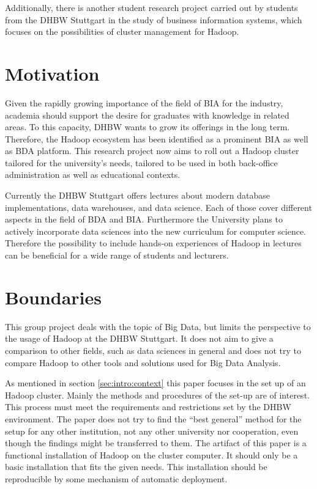 Additionally, there is another student research project carried out by students from the \ac{DHBW} Stuttgart in the study of business information systems, 
which focuses on the possibilities of cluster management for Hadoop. \autocite{wi2018managementsystems} 

\section{Motivation}
\label{sec:intro:motivation}

Given the rapidly growing importance of the field of \ac{BIA} for the industry, academia
should support the desire for graduates with knowledge in related areas. To this capacity,
\ac{DHBW} wants to grow its offerings in the long term. Therefore, the Hadoop ecosystem has
been identified as a prominent \ac{BIA} as well as \ac{BDA} platform. This research project now
aims to roll out a Hadoop cluster tailored for the university’s needs, tailored to be used in
both back-office administration as well as educational contexts.

Currently the \ac{DHBW} Stuttgart offers lectures about modern database implementations, 
data warehouses, and data science. Each of those cover different aspects in the field of \ac{BDA} and \ac{BIA}. Furthermore the University plans to actively incorporate data sciences into the new curriculum for computer science.
Therefore the possibility to include hands-on experiences of Hadoop in lectures can be beneficial for a wide range of students and lecturers.

\section{Boundaries}
\label{sec:intro:boundaries}

This group project deals with the topic of Big Data, but limits the perspective to the usage of Hadoop at the \ac{DHBW} Stuttgart.
It does not aim to give a comparison to other fields, such as data sciences in general and does not try to compare Hadoop to other tools and solutions used for Big Data Analysis.

As mentioned in section \ref{sec:intro:context} this paper focuses in the set up of an Hadoop cluster.
Mainly the methods and procedures of the set-up
are of interest.
This process must meet the requirements and restrictions set by the \ac{DHBW} environment. 
The paper does not try to find the \enquote{best general} method for the setup for any other institution, not any other university nor cooperation, even though the findings might be transferred to them.
The artifact of this paper is a functional installation of Hadoop on the cluster computer.
It should only be a basic installation that fits the given needs. 
This installation should be reproducible by some mechanism of automatic deployment.

